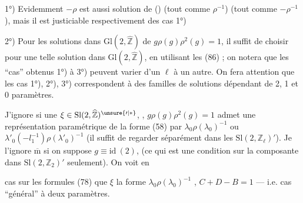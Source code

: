 

  1°) Evidemment $-\rho$ est aussi solution de ()
(tout comme $\rho^{-1}$) 
(tout comme $-\rho^{-1}$), mais il est justiciable
respectivement des cas  1°) 

2°) Pour  les solutions dans $\mathrm{Gl}(2,\widehat{\mathbb Z})$
de $g\rho(g)\rho^2(g)=1$, il suffit de choisir pour
\unsure{$\forall\,\ell$} une telle solution dans $\mathrm{Gl}(2,\widehat{\mathbb Z})$, en
utilisant les  (86) ; on notera que
les ``cas'' obtenus 1°) à 3°) peuvent varier d'un
$\ell$ à un autre. 
On fera attention que les cas 1°), 2°), 3°)
correspondent  à des familles de
solutions dépendant de 2, 1 et 0 paramètres.

 J'ignore si une $\xi\in\mathrm{Sl}(2,\widehat{\mathbb Z})^{\unsure{\prime|*}}$, , 
$g\rho(g)\rho^2(g)=1$ admet une représentation
paramétrique de la forme (58)
par $\lambda_0\rho(\lambda_0)^{-1}$ ou $\lambda'_0(-l_1^{-1})\rho(\lambda'_0)^{-1}$
(il suffit
de regarder séparément dans les $\mathrm{Sl}(2,\mathbb Z_\ell)'$).
Je l'ignore $\overline{\mathrm m}$ si on suppose $g\equiv\mathrm{id}\ (2)$,
(ce qui est une condition sur la composante
dans $\mathrm{Sl}(2,\mathbb Z_2)'$ seulement). On voit en



 cas sur les formules (78) que  $\xi$
 la forme $\lambda_0\rho(\lambda_0)^{-1}$
,
 
 $C+D-B=1$ --- i.e. 
 cas ``général'' à deux paramètres.


